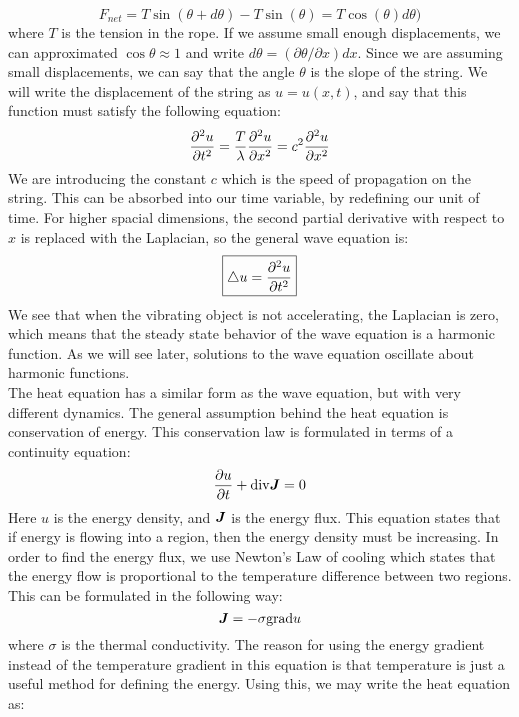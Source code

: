 \documentclass{paper}
\begin{document}
\begin{equation}
    F_{net}=T \sin(\theta + d\theta)-T \sin(\theta)=T\cos(\theta)d\theta)
\end{equation}
where $T$ is the tension in the rope. If we assume small enough displacements, we can approximated $\cos\theta\approx 1$ and write $d\theta= (\partial\theta/\partial x) dx$. Since we are assuming small displacements, we can say that the angle $\theta$ is the slope of the string. We will write the displacement of the string as $u=u(x,t)$, and say that this function must satisfy the following equation:
\begin{equation}\frac{\partial ^2 u}{\partial t^2}= \frac{T}{\lambda}\frac{\partial ^2 u}{\partial x^2}=c^2 \frac{\partial ^2 u}{\partial x^2}\end{equation}
We are introducing the constant $c$ which is the speed of propagation on the string. This can be absorbed into our time variable, by redefining our unit of time. For higher spacial dimensions, the second partial derivative with respect to $x$ is replaced with the Laplacian, so the general wave equation is:
\begin{equation}
  \boxed{
    \bigtriangleup u =\frac{\partial ^2 u}{\partial t^2}
  }
\end{equation}
We see that when the vibrating object is not accelerating, the Laplacian is zero, which means that the steady state behavior of the wave equation is a harmonic function. As we will see later, solutions to the wave equation oscillate about harmonic functions.\\
The heat equation has a similar form as the wave equation, but with very different dynamics. The general assumption behind the heat equation is conservation of energy. This conservation law is formulated in terms of a continuity equation:
\begin{equation}
  \frac{\partial u}{\partial t}+\mathrm{div} \bm{J}=0
\end{equation}
Here $u$ is the energy density, and $\bm{J}$ is the energy flux. This equation states that if energy is flowing into a region, then the energy density must be increasing. In order to find the energy flux, we use Newton's Law of cooling which states that the energy flow is proportional to the temperature difference between two regions. This can be formulated in the following way:
\begin{equation}
  \bm{J}=-\sigma\mathrm{grad} u
\end{equation}
where $\sigma$ is the thermal conductivity. The reason for using the energy gradient instead of the temperature gradient in this equation is that temperature is just a useful method for defining the energy. Using this, we may write the heat equation as:
\end{document}

